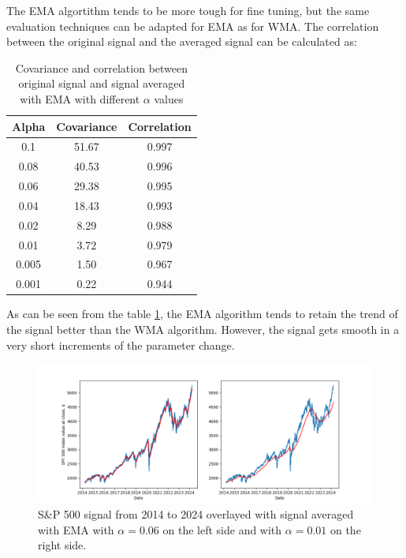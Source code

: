 \documentclass[a4paper,12pt,fleqn]{article}
\begin{document}
                The EMA algortithm tends to be more tough for fine tuning, but the same evaluation techniques can
                be adapted for EMA as for WMA. The correlation between the original signal and the averaged signal can be calculated as:
                
                \begin{table}[ht]
                    \centering
                    \begin{tabular}{|c|c|c|}
                        \hline
                        Alpha & Covariance & Correlation \\
                        \hline
                        0.1 & 51.67 & 0.997\\
                        0.08 & 40.53 & 0.996 \\
                        0.06& 29.38 & 0.995 \\
                        0.04& 18.43& 0.993 \\
                        0.02& 8.29 & 0.988 \\
                        0.01& 3.72 & 0.979 \\
                        0.005& 1.50 & 0.967 \\
                        0.001 & 0.22 & 0.944 \\
                       
                        \hline
                    \end{tabular}
                    \caption{Covariance and correlation between original signal and signal averaged with EMA with different $\alpha$ values}
                    \label{tab:correlation_covariance}
                \end{table}
                
            As can be seen from the table \ref{tab:correlation_covariance}, the EMA algorithm tends to retain 
            the trend of the signal better than the WMA algorithm. However, the signal gets smooth in a very short increments of the parameter change.

            \begin{figure}[ht]
                \centering
                \includegraphics[width=1\textwidth]{images/EMA_ex_2.png} %
                \caption{S\&P 500 signal from 2014 to 2024 overlayed with signal averaged with EMA with $\alpha= 0.06$ on the left side
                and with $\alpha= 0.01$ on the right side.}
                \label{fig:EMA_ex_2}
            \end{figure}
\end{document}
